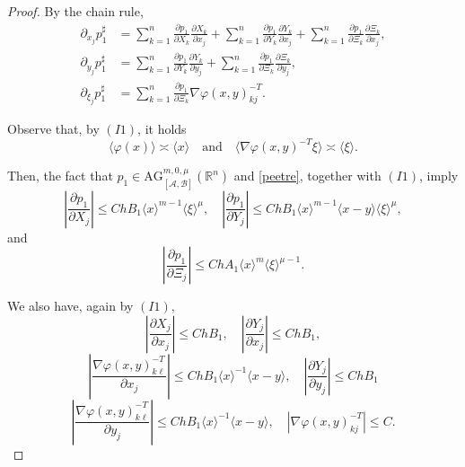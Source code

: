 \documentclass[10pt,a4paper]{amsart}
\newcommand{\AG}{{\mathrm{AG}}}
\newcommand{\A}{{\mathcal{A}}} %
\newcommand{\B}{{\mathcal{B}}} %
\begin{document}
\begin{proof}
	By the chain rule, 
	\begin{equation}\label{dxp}
	\begin{aligned}
		\partial_{x_j}p_1^\sharp &= \sum_{k=1}^n \frac{\partial p_1}{\partial X_k}\frac{\partial X_k}{\partial x_j} + 
		\sum_{k=1}^{n}\frac{\partial p_1}{\partial Y_k}\frac{\partial Y_k}{\partial x_j} + 
		\sum_{k=1}^{n}\frac{\partial p_1}{\partial \Xi_k}\frac{\partial \Xi_k}{\partial x_j},
	\\
		\partial_{y_j}p_1^\sharp &= \sum_{k=1}^{n}\frac{\partial p_1}{\partial Y_k}\frac{\partial Y_k}{\partial y_j} + \sum_{k=1}^{n}\frac{\partial p_1}{\partial \Xi_k}\frac{\partial \Xi_k}{\partial y_j},
	\\
		\partial_{\xi_j}p_1^\sharp &= \sum_{k=1}^n \frac{\partial p_1}{\partial\Xi_k}\nabla\varphi(x,y)_{kj}^{-T}.
	\end{aligned}
	\end{equation}
	
	Observe that, by $(I1)$, it holds
	\[
		\langle\varphi(x)\rangle \asymp \langle x\rangle\quad\text{and}\quad \langle \nabla\varphi(x,y)^{-T}\xi\rangle \asymp \langle\xi\rangle.
	\]
	
	Then, the fact that $p_1\in \AG_{[\A,\B]}^{m,0,\mu}(\mathbb{R}^n)$ and \eqref{peetre}, together with $(I1)$, imply
	\begin{equation*}
		\left|\frac{\partial p_1}{\partial X_j}\right| \leq Ch B_1\langle x\rangle^{m-1}  \langle \xi\rangle^{\mu},\quad 
		\left|\frac{\partial p_1}{\partial Y_j}\right| \leq Ch B_1 \langle x\rangle^{m-1} \langle x-y\rangle \langle \xi\rangle^{\mu},
	\end{equation*}
	and
	\begin{equation*}
		\left|\frac{\partial p_1}{\partial \Xi_j}\right| \leq Ch A_1 \langle x\rangle^{m} \langle\xi\rangle^{\mu-1}.
	\end{equation*}
	
	We also have, again by $(I1)$,
	\begin{equation*}
		\left|\frac{\partial X_j}{\partial x_j}\right| \leq Ch B_1 ,\quad %
		\left|\frac{\partial Y_j}{\partial x_j}\right| \leq Ch B_1, %
	\end{equation*}
	\begin{equation*}
		\left| \frac{\nabla\varphi(x,y)_{k\ell}^{-T}}{\partial x_j}\right| \leq Ch B_1\langle x\rangle^{-1}\langle x-y\rangle,
		\quad \left|\frac{\partial Y_j}{\partial y_j}\right| \leq Ch B_1%
	\end{equation*}
	\begin{equation*}
		\left|\frac{\nabla\varphi(x,y)_{k\ell}^{-T}}{\partial y_j}\right| \leq Ch B_1\langle x\rangle^{-1}\langle x-y\rangle,\quad |\nabla\varphi(x,y)_{kj}^{-T}|\leq C.
	\end{equation*}
	

\end{proof}
\end{document}
